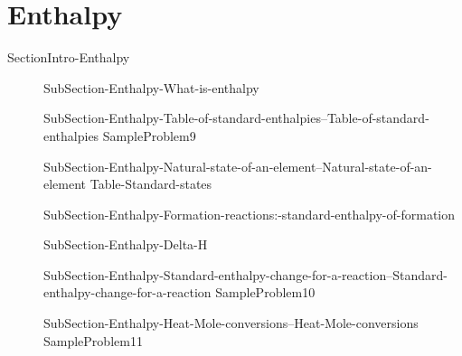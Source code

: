 \documentclass[main.tex]{subfiles}
\newcommand\chapterlabel{Ch-thermochemistry}\setcounter{figurenewcounter}{0}\setcounter{tablenewcounter}{0}\setcounter{formulanewcounter}{0}
\begin{document}
  \section{Enthalpy}%
{SectionIntro-Enthalpy}%
\sloppy\begin{description}%
\item[] {SubSection-Enthalpy-What-is-enthalpy}%
\item[] %
{SubSection-Enthalpy-Table-of-standard-enthalpies--Table-of-standard-enthalpies}%
{SampleProblem9}%
\item[]{SubSection-Enthalpy-Natural-state-of-an-element--Natural-state-of-an-element}%
{Table-Standard-states}%
\item[] {SubSection-Enthalpy-Formation-reactions:-standard-enthalpy-of-formation}%
 \item[]{SubSection-Enthalpy-Delta-H}%
\item[] {SubSection-Enthalpy-Standard-enthalpy-change-for-a-reaction--Standard-enthalpy-change-for-a-reaction}%
{SampleProblem10}%
\item[] {SubSection-Enthalpy-Heat-Mole-conversions--Heat-Mole-conversions}%
{SampleProblem11}%
\end{description}%
  
  
\end{document}
